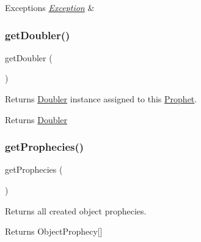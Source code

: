 \begin{DoxyExceptions}{Exceptions}
{\em \mbox{\hyperlink{namespace_prophecy_1_1_exception}{Exception}}} & \\
\hline
\end{DoxyExceptions}
\mbox{\label{class_prophecy_1_1_prophet_a37e4dba69fc63fdec7ce094ae5d888ee}} 
\subsubsection{\texorpdfstring{get\+Doubler()}{getDoubler()}}
{\footnotesize\ttfamily get\+Doubler (\begin{DoxyParamCaption}{ }\end{DoxyParamCaption})}

Returns \mbox{\hyperlink{namespace_prophecy_1_1_doubler}{Doubler}} instance assigned to this \mbox{\hyperlink{class_prophecy_1_1_prophet}{Prophet}}.

\begin{DoxyReturn}{Returns}
\mbox{\hyperlink{namespace_prophecy_1_1_doubler}{Doubler}} 
\end{DoxyReturn}
\mbox{\label{class_prophecy_1_1_prophet_a06770379bed34f1d3b9173c9a33f9f4e}} 
\subsubsection{\texorpdfstring{get\+Prophecies()}{getProphecies()}}
{\footnotesize\ttfamily get\+Prophecies (\begin{DoxyParamCaption}{ }\end{DoxyParamCaption})}

Returns all created object prophecies.

\begin{DoxyReturn}{Returns}
Object\+Prophecy\mbox{[}\mbox{]} 
\end{DoxyReturn}
\mbox{\label{class_prophecy_1_1_prophet_aee3901b35180731fb3b3bc51de4d894b}} 
